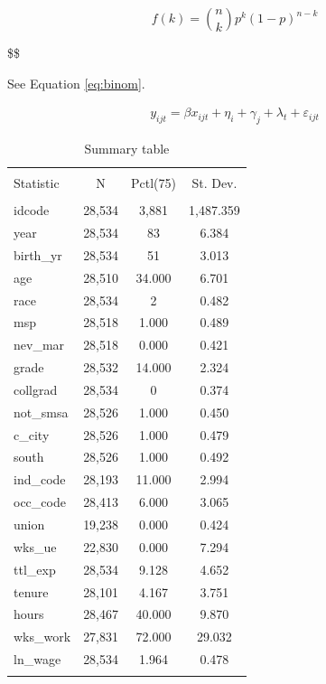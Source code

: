 \documentclass[
  12pt,
]{article}
\begin{document}
\begin{equation}
f\left(k\right)=\binom{n}{k}p^k\left(1-p\right)^{n-k} \label{eq:binom}
\end{equation}

\$\$

See Equation \eqref{eq:binom}.

\begin{align}
y_{ijt} = \beta x_{ijt} + \eta_i + \gamma_j + \lambda_t + \varepsilon_{ijt}
\end{align}

\begin{table}[ht] \centering 
  \caption{Summary table} 
  \label{tab23} 
\begin{tabular}{@{\extracolsep{5pt}}lccc} 
\\[-1.8ex]\hline 
\hline \\[-1.8ex] 
Statistic & \multicolumn{1}{c}{N} & \multicolumn{1}{c}{Pctl(75)} & \multicolumn{1}{c}{St. Dev.} \\ 
\hline \\[-1.8ex] 
idcode & 28,534 & 3,881 & 1,487.359 \\ 
year & 28,534 & 83 & 6.384 \\ 
birth\_yr & 28,534 & 51 & 3.013 \\ 
age & 28,510 & 34.000 & 6.701 \\ 
race & 28,534 & 2 & 0.482 \\ 
msp & 28,518 & 1.000 & 0.489 \\ 
nev\_mar & 28,518 & 0.000 & 0.421 \\ 
grade & 28,532 & 14.000 & 2.324 \\ 
collgrad & 28,534 & 0 & 0.374 \\ 
not\_smsa & 28,526 & 1.000 & 0.450 \\ 
c\_city & 28,526 & 1.000 & 0.479 \\ 
south & 28,526 & 1.000 & 0.492 \\ 
ind\_code & 28,193 & 11.000 & 2.994 \\ 
occ\_code & 28,413 & 6.000 & 3.065 \\ 
union & 19,238 & 0.000 & 0.424 \\ 
wks\_ue & 22,830 & 0.000 & 7.294 \\ 
ttl\_exp & 28,534 & 9.128 & 4.652 \\ 
tenure & 28,101 & 4.167 & 3.751 \\ 
hours & 28,467 & 40.000 & 9.870 \\ 
wks\_work & 27,831 & 72.000 & 29.032 \\ 
ln\_wage & 28,534 & 1.964 & 0.478 \\ 
\hline \\[-1.8ex] 
\end{tabular} 
\end{table}
\end{document}
